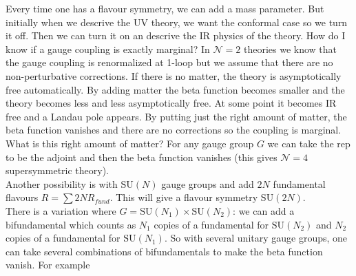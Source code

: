 \documentclass[11pt]{article}
\theoremstyle{definition}
\numberwithin{equation}{section}
\newcommand*\cN{\mathcal{N}}
\newcommand*\SU{\mathrm{SU}}
\begin{document}
Every time one has a flavour symmetry, we can add a mass parameter. But initially when we descrive the UV theory, we want the conformal case so we turn it off. Then we can turn it on an descrive the IR physics of the theory. How do I know if a gauge coupling is exactly marginal? In $\cN=2$ theories we know that the gauge coupling is renormalized at 1-loop but we assume that there are no non-perturbative corrections. If there is no matter, the theory is asymptotically free automatically. By adding matter the beta function becomes smaller and the theory becomes less and less asymptotically free. At some point it becomes IR free and a Landau pole appears. By putting just the right amount of matter, the beta function vanishes and there are no corrections so the coupling is marginal. What is this right amount of matter? For any gauge group $G$ we can take the rep to be the adjoint and then the beta function vanishes (this gives $\cN=4$ supersymmetric theory).\\
Another possibility is with $\SU(N)$ gauge groups and add $2N$ fundamental flavours $R=\sum 2N R_{fund}$. This will give a flavour symmetry $\SU(2N)$.\\
There is a variation where $G=\SU(N_{1})\times \SU(N_{2})$: we can add a bifundamental which counts as $N_{1}$ copies of a fundamental for $\SU(N_{2})$ and $N_{2}$ copies of a fundamental for $\SU(N_{1})$. So with several unitary gauge groups, one can take several combinations of bifundamentals to make the beta function vanish. For example
\end{document}

